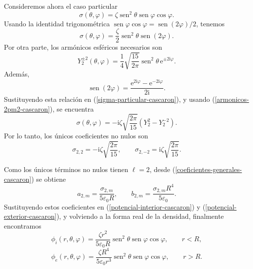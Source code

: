 \documentclass[11pt]{article}
\newcommand{\ii}{\mathrm{i}}
\newcommand{\e}{\mathrm{e}}
\newcommand{\sen}{\operatorname{sen}}
\begin{document}
Consideremos ahora el caso particular
\begin{equation}
\label{sigma-particular-cascaron}
\sigma(\theta,\varphi)=\zeta\sen^2\theta\sen\varphi\cos\varphi.
\end{equation}
Usando la identidad trigonométrica $\sen\varphi\cos\varphi=\sen(2\varphi)/2$, tenemos
\begin{equation*}
\sigma(\theta,\varphi)=\frac{\zeta}{2}\sen^2\theta\sen(2\varphi).
\end{equation*}
Por otra parte, los armónicos esféricos necesarios son
\begin{equation}
\label{armonicos-2pm2-cascaron}
Y_2^{\pm2}(\theta,\varphi)=\frac{1}{4}\sqrt{\frac{15}{2\pi}}\sen^2\theta\,\e^{\pm2\ii\varphi}.
\end{equation}
Además,
\begin{equation*}
\sen(2\varphi)=\frac{\e^{2\ii\varphi}-\e^{-2\ii\varphi}}{2\ii}.
\end{equation*}
Sustituyendo esta relación en (\ref{sigma-particular-cascaron}), y usando (\ref{armonicos-2pm2-cascaron}), se encuentra
\begin{equation}
\label{sigma-en-armonicos-cascaron}
\sigma(\theta,\varphi)
=-\ii\zeta\sqrt{\frac{2\pi}{15}}\left(Y_2^2-Y_2^{-2}\right).
\end{equation}
Por lo tanto, los únicos coeficientes no nulos son
\begin{equation}
\label{coef-sigma-particular-cascaron}
\sigma_{2,2}=-\ii\zeta\sqrt{\frac{2\pi}{15}},
\qquad
\sigma_{2,-2}=\ii\zeta\sqrt{\frac{2\pi}{15}}.
\end{equation}

Como los únicos términos no nulos tienen $\ell=2$, desde (\ref{coeficientes-generales-cascaron}) se obtiene
\begin{equation*}
a_{2,m}=\frac{\sigma_{2,m}}{5\varepsilon_0R},
\qquad
b_{2,m}=\frac{\sigma_{2,m}R^4}{5\varepsilon_0}.
\end{equation*}
Sustituyendo estos coeficientes en (\ref{potencial-interior-cascaron}) y (\ref{potencial-exterior-cascaron}), y volviendo a la forma real de la densidad, finalmente encontramos
\begin{equation*}
\boxed{
\phi_i(r,\theta,\varphi)=\frac{\zeta r^2}{5\varepsilon_0R}\sen^2\theta\sen\varphi\cos\varphi},
\qquad r<R,
\end{equation*}
\begin{equation*}
\boxed{
\phi_e(r,\theta,\varphi)=\frac{\zeta R^4}{5\varepsilon_0r^3}\sen^2\theta\sen\varphi\cos\varphi},
\qquad r>R.
\end{equation*}
\end{document}
